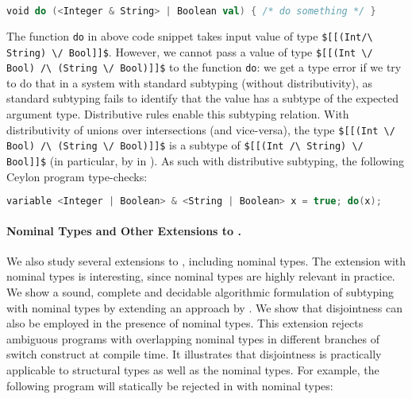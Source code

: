 \begin{lstlisting}[language=Scala]
  void do (<Integer & String> | Boolean val) { /* do something */ }
\end{lstlisting}

\noindent
The function \lstinline{do} in above code snippet takes input value of type
\lstinline{$[[(Int/\ String) \/ Bool]]$}. However, we cannot pass a value of
type \lstinline{$[[(Int \/ Bool) /\ (String \/ Bool)]]$}
to the function \lstinline{do}: we get a type error if we try
to do that in a system with standard subtyping (without distributivity),
as standard subtyping fails to identify that the value has a subtype of the
expected argument type.
Distributive rules enable this subtyping relation.
With distributivity of unions over intersections
(and vice-versa), the type \lstinline{$[[(Int \/ Bool) /\ (String \/ Bool)]]$} is a subtype
of \lstinline{$[[(Int /\ String) \/ Bool]]$}
(in particular, by  in ).
As such
with distributive subtyping, the following Ceylon program type-checks:

\begin{lstlisting}[language=Scala]
  variable <Integer | Boolean> & <String | Boolean> x = true; do(x);
\end{lstlisting}

\begin{comment}
In our work we study an expressive subtyping relation with various
distributivity rules and nominal types.
\end{comment}

\paragraph*{Nominal Types and Other Extensions to \name.}
We also study several extensions to \name, including nominal types.
The extension with nominal
types is interesting, since nominal types are highly relevant in practice.
We show a sound, complete and decidable algorithmic formulation of subtyping
with nominal types by extending an approach by \cite{huang2021distributing}.
We show that
disjointness can also be employed in the presence of nominal types.
This extension rejects ambiguous programs
with overlapping nominal types in different branches of switch
construct at compile time. It illustrates that disjointness is practically
applicable to structural types as well as the nominal types.
For example, the following program will statically be rejected in \name with
nominal types:

